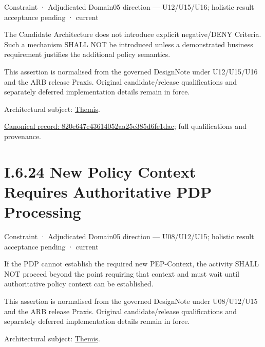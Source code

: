 \label{element:820e647c43614052aa25e385d6fe1dac}
{\small Constraint · Adjudicated Domain05 direction — U12/U15/U16; holistic result acceptance pending · current}\par

The Candidate Architecture does not introduce explicit negative/DENY Criteria. Such a mechanism SHALL NOT be introduced unless a demonstrated business requirement justifies the additional policy semantics.



This assertion is normalised from the governed DesignNote under U12/U15/U16 and the ARB release Praxis. Original candidate/release qualifications and separately deferred implementation details remain in force.



Architectural subject: \hyperref[element:899d34ec491948b68aad09e507dea6d1]{Themis}.


{\footnotesize \href{../../../../../../../continuum/motivation/constraint/820e647c43614052aa25e385d6fe1dac.md}{Canonical record: 820e647c43614052aa25e385d6fe1dac}; full qualifications and provenance.}\par
\section*{I.6.24 New Policy Context Requires Authoritative PDP Processing}
\label{navigation:I.6.24}

\label{element:80629d4c229e4b7095d011bf77d704aa}
{\small Constraint · Adjudicated Domain05 direction — U08/U12/U15; holistic result acceptance pending · current}\par

If the PDP cannot establish the required new PEP-Context, the activity SHALL NOT proceed beyond the point requiring that context and must wait until authoritative policy context can be established.



This assertion is normalised from the governed DesignNote under U08/U12/U15 and the ARB release Praxis. Original candidate/release qualifications and separately deferred implementation details remain in force.



Architectural subject: \hyperref[element:899d34ec491948b68aad09e507dea6d1]{Themis}.


